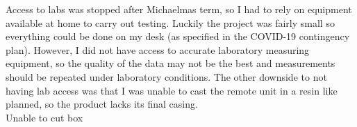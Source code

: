 \documentclass{IIBproject}
\begin{document}
Access to labs was stopped after Michaelmas term, so I had to rely on equipment available at home to carry out testing. Luckily the project was fairly small so everything could be done on my desk (as specified in the COVID-19 contingency plan). However, I did not have access to accurate laboratory measuring equipment, so the quality of the data may not be the best and measurements should be repeated under laboratory conditions. The other downside to not having lab access was that I was unable to cast the remote unit in a resin like planned, so the product lacks its final casing.\\




Unable to cut box
\end{document}
